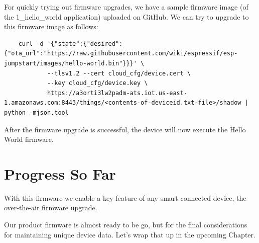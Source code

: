 \documentclass[main.tex]{subfiles}
\begin{document}
For quickly trying out firmware upgrades, we have a sample firmware image (of the 1\_hello\_world application) uploaded on GitHub. We can try to upgrade to this firmware image as follows:

\begin{verbatim}
    curl -d '{"state":{"desired":{"ota_url":"https://raw.githubusercontent.com/wiki/espressif/esp-jumpstart/images/hello-world.bin"}}}' \
            --tlsv1.2 --cert cloud_cfg/device.cert \
            --key cloud_cfg/device.key \
            https://a3orti3lw2padm-ats.iot.us-east-1.amazonaws.com:8443/things/<contents-of-deviceid.txt-file>/shadow | python -mjson.tool
\end{verbatim}

After the firmware upgrade is successful, the device will now execute the Hello World firmware.

\section{Progress So Far}
With this firmware we enable a key feature of any smart connected device, the over-the-air firmware upgrade. 

Our product firmware is almost ready to be go, but for the final considerations for maintaining unique device data. Let's wrap that up in the upcoming Chapter.
\end{document}
